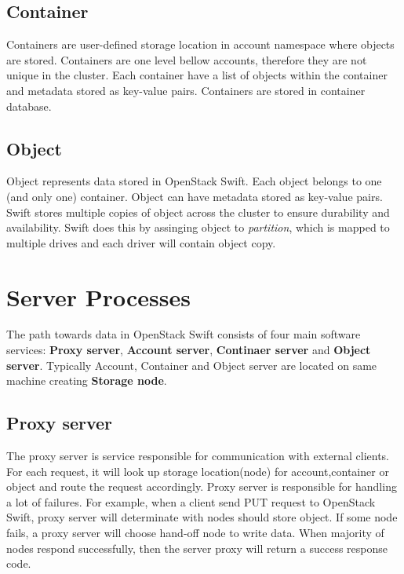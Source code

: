     \subsection{Container}
    Containers are user-defined storage location in account namespace where objects are stored. Containers are one level bellow accounts, therefore they are not unique in the cluster. Each container have a list of objects within the container and metadata stored as key-value pairs. Containers are stored in container database\cite{swiftOpenStackSwift}.

    \subsection{Object}
    Object represents data stored in OpenStack Swift. Each object belongs to one (and only one) container. Object can have metadata stored as key-value pairs. Swift stores multiple copies of object across the cluster to ensure durability and availability. Swift does this by assinging object to \textit{partition}, which is mapped to multiple drives and each driver will contain object copy\cite{swiftOpenStackSwift}.

    \section{Server Processes}
    The path towards data in OpenStack Swift consists of four main software services: \textbf{Proxy server}, \textbf{Account server}, \textbf{Continaer server} and \textbf{Object server}. Typically Account, Container and Object server are located on same machine creating \textbf{Storage node}.

    \subsection{Proxy server}
    The proxy server is service responsible for communication with external clients. For each request, it will look up storage location(node) for account,container or object and route the request accordingly\cite{SwiftArchitecturalOverview}. Proxy server is responsible for handling a lot of failures. For example, when a client send PUT request to OpenStack Swift, proxy server will determinate with nodes should store object. If some node fails, a proxy server will choose hand-off node to write data. When majority of nodes respond successfully, then the server proxy will return a success response code\cite{swiftOpenStackSwift}.

